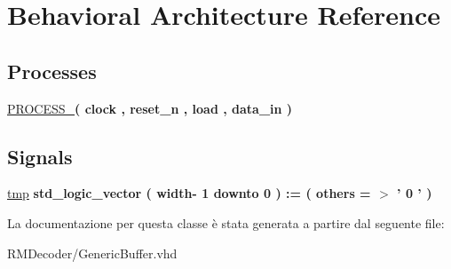 \hypertarget{class_generic_buffer_1_1_behavioral}{\section{Behavioral Architecture Reference}
\label{class_generic_buffer_1_1_behavioral}
}
\subsection*{Processes}
 \begin{DoxyCompactItemize}
\item 
\hypertarget{class_generic_buffer_1_1_behavioral_ga2ee480e118ca2b3fccf26139a66e84ad}{\hyperlink{group___r_m_decoder_ga2ee480e118ca2b3fccf26139a66e84ad}{P\+R\+O\+C\+E\+S\+S\+\_}{\bfseries  ( {\bfseries \textcolor{vhdlchar}{clock}\textcolor{vhdlchar}{ }} , {\bfseries \textcolor{vhdlchar}{reset\+\_\+n}\textcolor{vhdlchar}{ }} , {\bfseries \textcolor{vhdlchar}{load}\textcolor{vhdlchar}{ }} , {\bfseries \textcolor{vhdlchar}{data\+\_\+in}\textcolor{vhdlchar}{ }} )}}\label{class_generic_buffer_1_1_behavioral_ga2ee480e118ca2b3fccf26139a66e84ad}

\end{DoxyCompactItemize}
\subsection*{Signals}
 \begin{DoxyCompactItemize}
\item 
\hypertarget{class_generic_buffer_1_1_behavioral_gab94e66105790803865249c33633e359f}{\hyperlink{group___r_m_decoder_gab94e66105790803865249c33633e359f}{tmp} {\bfseries \textcolor{vhdlchar}{std\+\_\+logic\+\_\+vector}\textcolor{vhdlchar}{ }\textcolor{vhdlchar}{(}\textcolor{vhdlchar}{ }\textcolor{vhdlchar}{ }\textcolor{vhdlchar}{ }\textcolor{vhdlchar}{ }\textcolor{vhdlchar}{width}\textcolor{vhdlchar}{-\/}\textcolor{vhdlchar}{ } \textcolor{vhdldigit}{1} \textcolor{vhdlchar}{ }\textcolor{vhdlchar}{downto}\textcolor{vhdlchar}{ }\textcolor{vhdlchar}{ } \textcolor{vhdldigit}{0} \textcolor{vhdlchar}{ }\textcolor{vhdlchar}{)}\textcolor{vhdlchar}{ }\textcolor{vhdlchar}{ }\textcolor{vhdlchar}{ }\textcolor{vhdlchar}{\+:}\textcolor{vhdlchar}{=}\textcolor{vhdlchar}{ }\textcolor{vhdlchar}{(}\textcolor{vhdlchar}{ }\textcolor{vhdlchar}{ }\textcolor{vhdlchar}{others}\textcolor{vhdlchar}{ }\textcolor{vhdlchar}{ }\textcolor{vhdlchar}{=}\textcolor{vhdlchar}{ }\textcolor{vhdlchar}{$>$}\textcolor{vhdlchar}{ }\textcolor{vhdlchar}{'}\textcolor{vhdlchar}{ } \textcolor{vhdldigit}{0} \textcolor{vhdlchar}{ }\textcolor{vhdlchar}{'}\textcolor{vhdlchar}{ }\textcolor{vhdlchar}{)}\textcolor{vhdlchar}{ }} }\label{class_generic_buffer_1_1_behavioral_gab94e66105790803865249c33633e359f}

\end{DoxyCompactItemize}


La documentazione per questa classe è stata generata a partire dal seguente file\+:\begin{DoxyCompactItemize}
\item 
R\+M\+Decoder/Generic\+Buffer.\+vhd\end{DoxyCompactItemize}
